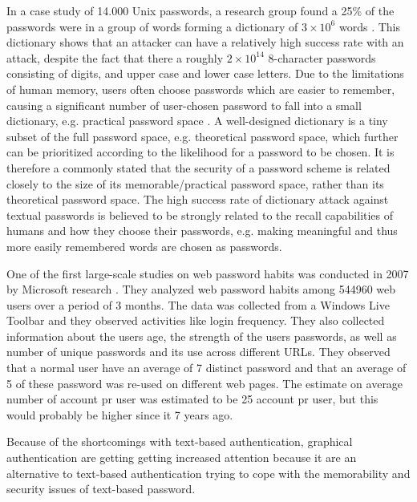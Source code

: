   In a case study of 14.000 Unix passwords, a research group found a 25\% of the passwords were in a group of words forming a dictionary of $3\times10^{6}$ words \cite{UnixPasswords}. This dictionary shows that an attacker can have a relatively high success rate with an attack, despite the fact that there a roughly $2\times10^{14}$ 8-character passwords consisting of digits, and upper case and lower case letters. Due to the limitations of human memory, users often choose passwords which are easier to remember, causing a significant number of user-chosen password to fall into a small dictionary, e.g. practical password space \cite{Tao}. A well-designed dictionary is a tiny subset of the full password space, e.g. theoretical password space, which further can be prioritized  according to the likelihood for a password to be chosen. It is therefore a commonly stated that the security of a password scheme is related closely to the size of its memorable/practical password space, rather than its theoretical password space. The high success rate of dictionary attack against textual passwords is believed to be strongly related to the recall capabilities of humans and how they choose their passwords, e.g. making meaningful and thus more easily remembered words are chosen as passwords. 

  One of the first large-scale studies on web password habits was conducted in 2007 by Microsoft research \cite{habits1}. They analyzed web password habits among 544960 web users over a period of 3 months. The data was collected from a Windows Live Toolbar and they observed activities like login frequency. They also collected information about the users age, the strength of the users passwords, as well as number of unique passwords and its use across different URLs. They observed that a normal user have an average of 7 distinct password and that an average of 5 of these password was re-used on different web pages. The estimate on average number of account pr user was estimated to be 25 account pr user, but this would probably be higher since it 7 years ago. 


  Because of the shortcomings with text-based authentication, graphical authentication are getting getting increased attention because it are an alternative to text-based authentication trying to cope with the memorability and security issues of text-based password.
